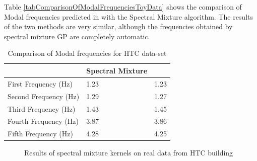 Table \ref{tabComparisonOfModalFrequenciesToyData} shows the comparison of Modal frequencies predicted in \cite{brincker2000modal} with the Spectral Mixture algorithm. The results of the two methods are very similar, although the frequencies obtained by spectral mixture GP are completely automatic. 

\renewcommand{\arraystretch}{1}
\begin{table}[!ht]
    \centering
\begin{tabular}{|l|l|l|}
  \hline
    & Spectral Mixture & \cite{brincker2000modal} \\
  \hline 
  \hline
First Frequency (Hz) & 1.23 & 1.23\\
Second Frequency (Hz)  & 1.29 & 1.27\\
Third Frequency (Hz) & 1.43 & 1.45\\
Fourth Frequency (Hz) & 3.87 & 3.86\\
Fifth Frequency (Hz) & 4.28 & 4.25\\
   \hline
\end{tabular}
\caption{Comparison of Modal frequencies for HTC data-set}
  \label{tabComparisonOfModalFrequenciesHTCData}
\end{table}

\begin{figure}[!ht]
  \centering
  \quad
    \quad
  
  \caption{Results of spectral mixture kernels on real data from HTC building}
\end{figure}

